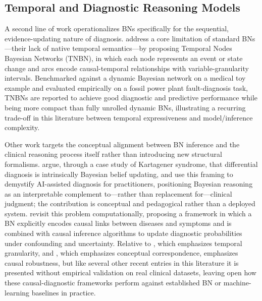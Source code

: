 \subsection{Temporal and Diagnostic Reasoning Models}
A second line of work operationalizes BNs specifically for the sequential, evidence-updating nature of diagnosis. \cite{figueroa2013temporal} address a core limitation of standard BNs---their lack of native temporal semantics---by proposing Temporal Nodes Bayesian Networks (TNBN), in which each node represents an event or state change and arcs encode causal-temporal relationships with variable-granularity intervals. Benchmarked against a dynamic Bayesian network on a medical toy example and evaluated empirically on a fossil power plant fault-diagnosis task, TNBNs are reported to achieve good diagnostic and predictive performance while being more compact than fully unrolled dynamic BNs, illustrating a recurring trade-off in this literature between temporal expressiveness and model/inference complexity.

Other work targets the conceptual alignment between BN inference and the clinical reasoning process itself rather than introducing new structural formalisms. \cite{rao2023medical} argue, through a case study of Kartagener syndrome, that differential diagnosis is intrinsically Bayesian belief updating, and use this framing to demystify AI-assisted diagnosis for practitioners, positioning Bayesian reasoning as an interpretable complement to---rather than replacement for---clinical judgment; the contribution is conceptual and pedagogical rather than a deployed system. \cite{zhang2026bayesian} revisit this problem computationally, proposing a framework in which a BN explicitly encodes causal links between diseases and symptoms and is combined with causal inference algorithms to update diagnostic probabilities under confounding and uncertainty. Relative to \cite{figueroa2013temporal}, which emphasizes temporal granularity, and \cite{rao2023medical}, which emphasizes conceptual correspondence, \cite{zhang2026bayesian} emphasizes causal robustness, but like several other recent entries in this literature it is presented without empirical validation on real clinical datasets, leaving open how these causal-diagnostic frameworks perform against established BN or machine-learning baselines in practice.


